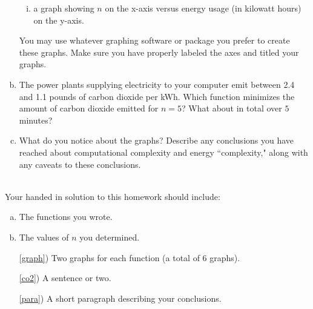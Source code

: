 \documentclass[12pt]{amsart}
\begin{document}
\begin{enumerate}[a)]
\begin{enumerate}[i)]
	\item a graph showing $n$ on the x-axis versus energy usage (in kilowatt hours) on the y-axis.
	\end{enumerate}
	You may use whatever graphing software or package you prefer to create these graphs.  Make sure you have properly labeled the axes and titled your graphs. 
\item \label{co2} The power plants supplying electricity to your computer emit between 2.4 and 1.1 pounds of carbon dioxide per kWh. 
Which function minimizes the amount of carbon dioxide emitted for $n=5$?  What about in total over $5$ minutes?
\item \label{para} What do you notice about the graphs?  Describe any conclusions you have reached about computational complexity and energy ``complexity," along with any caveats to these conclusions.
\end{enumerate}
~\\
\noindent Your handed in solution to this homework should include:
\begin{enumerate}[a)]
\item The functions you wrote.
\item The values of $n$ you determined.
\item[\ref{graph})] Two graphs for each function (a total of 6 graphs).
\item[\ref{co2})]  A sentence or two.
\item[\ref{para})] A short paragraph describing your conclusions.
\end{enumerate}
\end{document}
